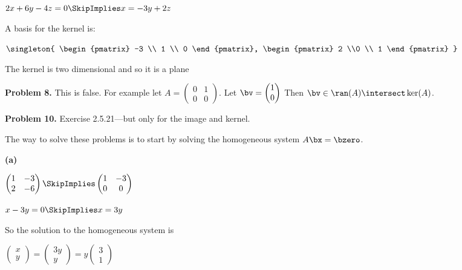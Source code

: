 \documentclass[oneside,12pt]{amsart}
\begin{document}
\bigskip

 $2x + 6y -4z = 0 \SkipImplies x = -3y +2z$

A basis for the kernel is:

$
\singleton{
\begin{pmatrix}
-3 \\ 1 \\ 0
\end{pmatrix},
\begin{pmatrix}
2 \\0 \\ 1
\end{pmatrix}
}
$

\bigskip

The kernel is two dimensional and so it is a plane



\bigskip


\textbf{Problem 8.} This is false. For example let
$
A=
\begin{pmatrix}
0 & 1 \\
0 & 0
\end{pmatrix}
$.
Let $\bv =
\begin{pmatrix}
1 \\ 0
\end{pmatrix}
$
Then $\bv\in\ran(A)\intersect\ker(A)$.

\bigskip

\textbf{Problem 10.} Exercise 2.5.21---but only for the image and kernel.

The way to solve these problems is to start by solving the homogeneous
system $A\bx=\bzero$.


\bigskip

\textbf{(a)}

\bigskip

$
\begin{pmatrix}
1 & -3 \\
2 & -6
\end{pmatrix}
\SkipImplies
\begin{pmatrix}
1 & -3 \\
0 & 0
\end{pmatrix}
$

\bigskip

$x - 3y = 0 \SkipImplies x = 3y$

\bigskip

So the solution to the homogeneous system is

$
\begin{pmatrix}
x \\
y
\end{pmatrix}
=
\begin{pmatrix}
3y \\ y
\end{pmatrix}
=
y
\begin{pmatrix}
3 \\ 1
\end{pmatrix}
$
\end{document}
